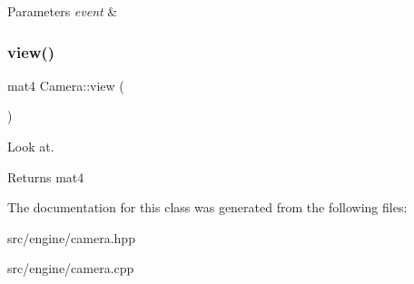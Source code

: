 \begin{DoxyParams}{Parameters}
{\em event} & \\
\hline
\end{DoxyParams}
\mbox{\label{classCamera_a8e6842eed5a91392ffbbf05a5c086a36}} 
\subsubsection{\texorpdfstring{view()}{view()}}
{\footnotesize\ttfamily mat4 Camera\+::view (\begin{DoxyParamCaption}{ }\end{DoxyParamCaption})}



Look at. 

\begin{DoxyReturn}{Returns}
mat4 
\end{DoxyReturn}


The documentation for this class was generated from the following files\+:\begin{DoxyCompactItemize}
\item 
src/engine/camera.\+hpp\item 
src/engine/camera.\+cpp\end{DoxyCompactItemize}
